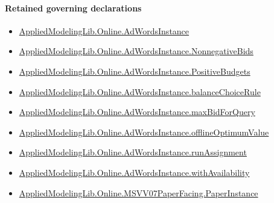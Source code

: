 \documentclass[10pt]{article}
\begin{document}
\paragraph{Retained governing declarations}
\begin{itemize}\raggedright
\item \hyperlink{governing-declaration-e5ce49672bf26ab1}{Applied\allowbreak{}Modeling\allowbreak{}Lib.\allowbreak{}Online.\allowbreak{}Ad\allowbreak{}Words\allowbreak{}Instance}
\item \hyperlink{governing-declaration-7bed8c5ff5e5cde7}{Applied\allowbreak{}Modeling\allowbreak{}Lib.\allowbreak{}Online.\allowbreak{}Ad\allowbreak{}Words\allowbreak{}Instance.\allowbreak{}Nonnegative\allowbreak{}Bids}
\item \hyperlink{governing-declaration-eabdcef9dca00922}{Applied\allowbreak{}Modeling\allowbreak{}Lib.\allowbreak{}Online.\allowbreak{}Ad\allowbreak{}Words\allowbreak{}Instance.\allowbreak{}Positive\allowbreak{}Budgets}
\item \hyperlink{governing-declaration-47ab5f144ca5a666}{Applied\allowbreak{}Modeling\allowbreak{}Lib.\allowbreak{}Online.\allowbreak{}Ad\allowbreak{}Words\allowbreak{}Instance.\allowbreak{}balance\allowbreak{}Choice\allowbreak{}Rule}
\item \hyperlink{governing-declaration-af1b7d959c110360}{Applied\allowbreak{}Modeling\allowbreak{}Lib.\allowbreak{}Online.\allowbreak{}Ad\allowbreak{}Words\allowbreak{}Instance.\allowbreak{}max\allowbreak{}Bid\allowbreak{}For\allowbreak{}Query}
\item \hyperlink{governing-declaration-421b6f6fda18a867}{Applied\allowbreak{}Modeling\allowbreak{}Lib.\allowbreak{}Online.\allowbreak{}Ad\allowbreak{}Words\allowbreak{}Instance.\allowbreak{}offline\allowbreak{}Optimum\allowbreak{}Value}
\item \hyperlink{governing-declaration-1878a8a2b3e3182d}{Applied\allowbreak{}Modeling\allowbreak{}Lib.\allowbreak{}Online.\allowbreak{}Ad\allowbreak{}Words\allowbreak{}Instance.\allowbreak{}run\allowbreak{}Assignment}
\item \hyperlink{governing-declaration-101a0980fa46912e}{Applied\allowbreak{}Modeling\allowbreak{}Lib.\allowbreak{}Online.\allowbreak{}Ad\allowbreak{}Words\allowbreak{}Instance.\allowbreak{}with\allowbreak{}Availability}
\item \hyperlink{governing-declaration-11907576ec71eeb5}{Applied\allowbreak{}Modeling\allowbreak{}Lib.\allowbreak{}Online.\allowbreak{}MSVV07\allowbreak{}Paper\allowbreak{}Facing.\allowbreak{}Paper\allowbreak{}Instance}

\end{itemize}
\end{document}
